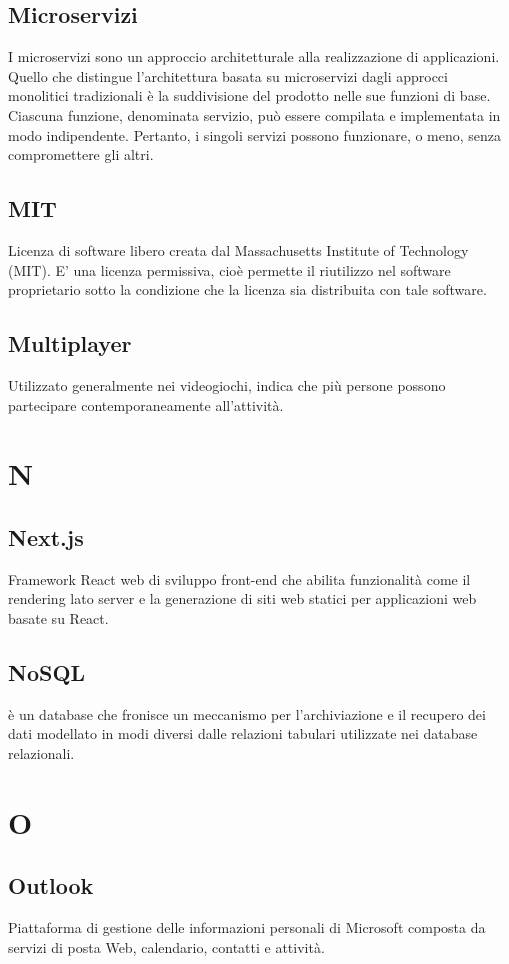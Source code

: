 \subsection*{Microservizi}
I microservizi sono un approccio architetturale alla realizzazione di applicazioni. 
Quello che distingue l'architettura basata su microservizi dagli approcci monolitici tradizionali è la suddivisione del prodotto nelle sue funzioni di base. Ciascuna funzione, denominata servizio, può essere compilata e implementata in modo indipendente. Pertanto, i singoli servizi possono funzionare, o meno, senza compromettere gli altri.

\subsection*{MIT}
Licenza di software libero creata dal Massachusetts Institute of Technology (MIT). E' una licenza permissiva, cioè permette il riutilizzo nel software proprietario sotto la condizione che la licenza sia distribuita con tale software.

\subsection*{Multiplayer}
Utilizzato generalmente nei videogiochi, indica che più persone possono partecipare contemporaneamente all'attività.

\section*{N}
\subsection*{Next.js}
Framework React web di sviluppo front-end che abilita funzionalità come il rendering lato server e la generazione di siti web statici per applicazioni web basate su React.

\subsection*{NoSQL}
è un database che fronisce un meccanismo per l'archiviazione e il recupero dei dati modellato in modi diversi dalle relazioni tabulari utilizzate nei database relazionali.
\section*{O}
\subsection*{Outlook}
Piattaforma di gestione delle informazioni personali di Microsoft composta da servizi di posta Web, calendario, contatti e attività.

